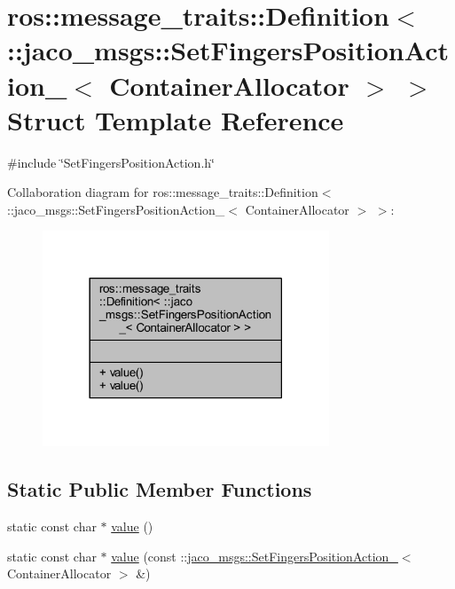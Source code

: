 \hypertarget{structros_1_1message__traits_1_1Definition_3_01_1_1jaco__msgs_1_1SetFingersPositionAction___3_01ContainerAllocator_01_4_01_4}{}\section{ros\+:\+:message\+\_\+traits\+:\+:Definition$<$ \+:\+:jaco\+\_\+msgs\+:\+:Set\+Fingers\+Position\+Action\+\_\+$<$ Container\+Allocator $>$ $>$ Struct Template Reference}
\label{structros_1_1message__traits_1_1Definition_3_01_1_1jaco__msgs_1_1SetFingersPositionAction___3_01ContainerAllocator_01_4_01_4}


{\ttfamily \#include \char`\"{}Set\+Fingers\+Position\+Action.\+h\char`\"{}}



Collaboration diagram for ros\+:\+:message\+\_\+traits\+:\+:Definition$<$ \+:\+:jaco\+\_\+msgs\+:\+:Set\+Fingers\+Position\+Action\+\_\+$<$ Container\+Allocator $>$ $>$\+:
\nopagebreak
\begin{figure}[H]
\begin{center}
\leavevmode
\includegraphics[width=242pt]{de/dac/structros_1_1message__traits_1_1Definition_3_01_1_1jaco__msgs_1_1SetFingersPositionAction___3_0197400234c83ac741cef27464d6863ee3}
\end{center}
\end{figure}
\subsection*{Static Public Member Functions}
\begin{DoxyCompactItemize}
\item 
static const char $\ast$ \hyperlink{structros_1_1message__traits_1_1Definition_3_01_1_1jaco__msgs_1_1SetFingersPositionAction___3_01ContainerAllocator_01_4_01_4_a931a889afb46ce9c4bf7cf95e67a24e0}{value} ()
\item 
static const char $\ast$ \hyperlink{structros_1_1message__traits_1_1Definition_3_01_1_1jaco__msgs_1_1SetFingersPositionAction___3_01ContainerAllocator_01_4_01_4_a5d1700c907a15fef5f7ab5b6fb48912c}{value} (const \+::\hyperlink{structjaco__msgs_1_1SetFingersPositionAction__}{jaco\+\_\+msgs\+::\+Set\+Fingers\+Position\+Action\+\_\+}$<$ Container\+Allocator $>$ \&)
\end{DoxyCompactItemize}


